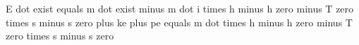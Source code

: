 E dot exist equals m dot exist minus m dot i times h minus h zero minus T zero times s minus s zero plus ke plus pe equals m dot times h minus h zero minus T zero times s minus s zero